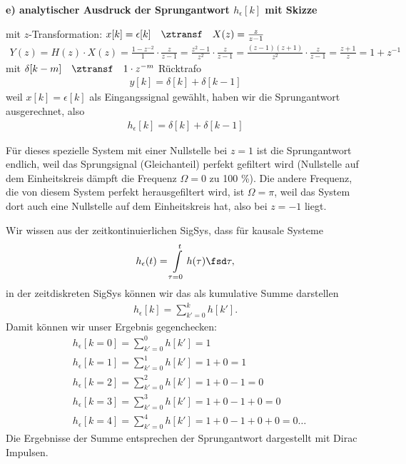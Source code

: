 \begin{Loesung}
\textbf{e) analytischer Ausdruck der Sprungantwort $h_\epsilon[k]$ mit Skizze}
%

mit $z$-Transformation: $x[k] = \epsilon[k] \quad\ztransf\quad X(z) = \frac{z}{z-1}$
%
\begin{align}
\label{eq:F0EF9C3FA6_Hz_Sprung}
Y(z) = H(z) \cdot X(z) = \frac{1-z^{-2}}{1} \cdot \frac{z}{z-1} =
 \frac{z^2-1}{z^2} \cdot \frac{z}{z-1} =
\frac{(z-1)(z+1)}{z^2} \cdot \frac{z}{z-1} =
\frac{z+1}{z} = 1 + z^{-1}
\end{align}
%
mit $\delta[k-m]  \quad\ztransf\quad 1 \cdot z^{-m}$ Rücktrafo
%
\begin{align}
y[k] = \delta[k] + \delta[k-1]
\end{align}
%
weil $x[k] = \epsilon[k]$ als Eingangssignal gewählt, haben wir die Sprungantwort
ausgerechnet, also
%
\begin{align}
h_\epsilon[k] = \delta[k] + \delta[k-1]
\end{align}
%
\begin{center}
\end{center}

Für dieses spezielle System mit einer Nullstelle bei $z=1$ ist die Sprungantwort endlich,
weil das Sprungsignal (Gleichanteil) perfekt gefiltert wird (Nullstelle auf dem
Einheitskreis dämpft die Frequenz $\Omega=0$ zu 100 \%).
%
Die andere Frequenz, die von diesem System perfekt herausgefiltert wird, ist
$\Omega=\pi$, weil das System dort auch eine Nullstelle auf dem Einheitskreis hat,
also bei $z=-1$ liegt.

Wir wissen aus der zeitkontinuierlichen SigSys, dass für kausale Systeme
\begin{align}
h_\epsilon(t) = \int\limits_{\tau=0}^{t} h(\tau) \fsd \tau,
\end{align}
in der zeitdiskreten SigSys können wir das als kumulative Summe darstellen
\begin{align}
h_\epsilon[k] = \sum\limits_{k'=0}^{k} h[k'].
\end{align}
%
Damit können wir unser Ergebnis gegenchecken:
%
\begin{align}
&h_\epsilon[k=0] = \sum\limits_{k'=0}^{0} h[k'] = 1\\
&h_\epsilon[k=1] = \sum\limits_{k'=0}^{1} h[k'] = 1 + 0 = 1\\
&h_\epsilon[k=2] = \sum\limits_{k'=0}^{2} h[k'] = 1 + 0 - 1 = 0\\
&h_\epsilon[k=3] = \sum\limits_{k'=0}^{3} h[k'] = 1 + 0 - 1 + 0 = 0\\
&h_\epsilon[k=4] = \sum\limits_{k'=0}^{4} h[k'] = 1 + 0 - 1 + 0 + 0 = 0\dots
\end{align}
%
Die Ergebnisse der Summe entsprechen der Sprungantwort dargestellt mit Dirac Impulsen.
%


\end{Loesung}
